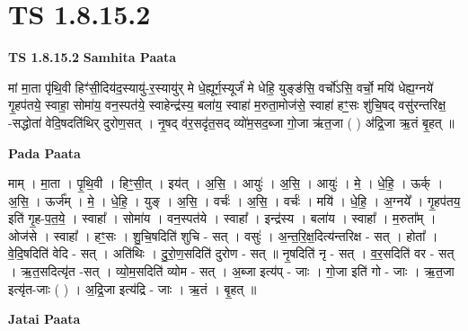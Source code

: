\documentclass[17pt]{extarticle}
\begin{document}
\section*{ TS 1.8.15.2 }

\textbf{TS 1.8.15.2 } \newline
\textbf{Samhita Paata} \newline

मां मा॒ता पृ॑थि॒वी हिꣳ॑सी॒दिय॑द॒स्यायु॑-र॒स्यायु॑र् मे धे॒ह्यूर्ग॒स्यूर्जं॑ मे धेहि॒ युङ्ङ॑सि॒ वर्चो॑ऽसि॒ वर्चो॒ मयि॑ धेह्य॒ग्नये॑ गृ॒हप॑तये॒ स्वाहा॒ सोमा॑य॒ वन॒स्पत॑ये॒ स्वाहेन्द्र॑स्य॒ बला॑य॒ स्वाहा॑ म॒रुता॒मोज॑से॒ स्वाहा॑ हꣳ॒॒सः शु॑चि॒षद् वसु॑रन्तरिक्ष॒ -सद्धोता॑ वेदि॒षदति॑थिर् दुरोण॒सत् । नृ॒षद् व॑र॒सदृ॑त॒सद् व्यो॑म॒सद॒ब्जा गो॒जा ऋ॑त॒जा ( ) अ॑द्रि॒जा ऋ॒तं बृ॒हत् ॥ \newline

\textbf{Pada Paata} \newline

माम् । मा॒ता । पृ॒थि॒वी । हिꣳ॒॒सी॒त् । इय॑त् । अ॒सि॒ । आयुः॑ । अ॒सि॒ । आयुः॑ । मे॒ । धे॒हि॒ । ऊर्क् । अ॒सि॒ । ऊर्ज᳚म् । मे॒ । धे॒हि॒ । युङ् । अ॒सि॒ । वर्चः॑ । अ॒सि॒ । वर्चः॑ । मयि॑ । धे॒हि॒ । अ॒ग्नये᳚ । गृ॒हप॑तय॒ इति॑ गृ॒ह-प॒त॒ये॒ । स्वाहा᳚ । सोमा॑य । वन॒स्पत॑ये । स्वाहा᳚ । इन्द्र॑स्य । बला॑य । स्वाहा᳚ । म॒रुता᳚म् । ओज॑से । स्वाहा᳚ । हꣳ॒॒सः । शु॒चि॒षदिति॑ शुचि - सत् । वसुः॑ । अ॒न्त॒रि॒क्ष॒दित्य॑न्तरिक्ष - सत् । होता᳚ । वे॒दि॒षदिति॑ वेदि - सत् । अति॑थिः । दु॒रो॒ण॒सदिति॑ दुरोण - सत् ॥ नृ॒षदिति॑ नृ - सत् । व॒र॒सदिति॑ वर - सत् । ऋ॒त॒सदित्यृ॑त -सत् । व्यो॒म॒सदिति॑ व्योम - सत् । अ॒ब्जा इत्य॑प् - जाः । गो॒जा इति॑ गो - जाः । ऋ॒त॒जा इत्यृ॑त-जाः ( ) । अ॒द्रि॒जा इत्य॑द्रि - जाः । ऋ॒तं । बृ॒हत् ॥  \newline



\textbf{Jatai Paata} \newline
\end{document}
